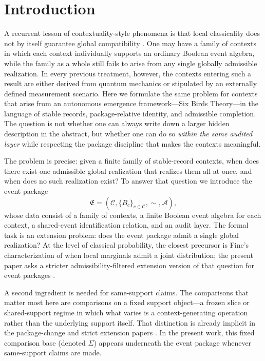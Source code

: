 \documentclass[11pt]{article}
\newcommand{\EventPackage}{\mathfrak{E}}
\theoremstyle{definition}
\begin{document}
\section{Introduction}\label{sec:introduction}
A recurrent lesson of contextuality-style phenomena is that local classicality does not by itself guarantee global compatibility \citep{Bell1966HiddenVariables,KochenSpecker1967Problem,AbramskyBrandenburger2011Sheaf,BudroniEtAl2022KochenSpecker}. One may have a family of contexts in which each context individually supports an ordinary Boolean event algebra, while the family as a whole still fails to arise from any single globally admissible realization. In every previous treatment, however, the contexts entering such a result are either derived from quantum mechanics or stipulated by an externally defined measurement scenario. Here we formulate the same problem for contexts that arise from an autonomous emergence framework---Six Birds Theory---in the language of stable records, package-relative identity, and admissible completion. The question is not whether one can always write down a larger hidden description in the abstract, but whether one can do so \emph{within the same audited layer} while respecting the package discipline that makes the contexts meaningful.

The problem is precise: given a finite family of stable-record contexts, when does there exist one admissible global realization that realizes them all at once, and when does no such realization exist? To answer that question we introduce the event package
\[
\EventPackage = (\mathcal C,\{B_c\}_{c\in\mathcal C},\sim,\mathcal A),
\]
whose data consist of a family of contexts, a finite Boolean event algebra for each context, a shared-event identification relation, and an audit layer. The formal task is an extension problem: does the event package admit a single global realization? At the level of classical probability, the closest precursor is Fine's characterization of when local marginals admit a joint distribution; the present paper asks a stricter admissibility-filtered extension version of that question for event packages \citep{Fine1982HiddenVariables}.

A second ingredient is needed for same-support claims. The comparisons that matter most here are comparisons on a fixed support object---a frozen slice or shared-support regime in which what varies is a context-generating operation rather than the underlying support itself. That distinction is already implicit in the package-change and strict extension papers \citep{Tsiokos2026PackageChange,Tsiokos2026Cantor}. In the present work, this fixed comparison base (denoted \(\Sigma\)) appears underneath the event package whenever same-support claims are made.
\end{document}
